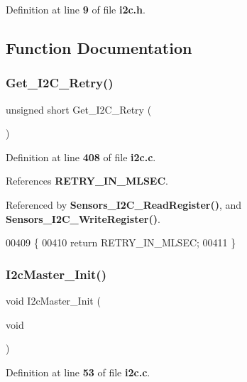 Definition at line \textbf{ 9} of file \textbf{ i2c.\+h}.



\subsection{Function Documentation}
\mbox{\label{i2c_8h_a62f1734db1e997e848ee534e49a7736f}} 
\subsubsection{Get\+\_\+\+I2\+C\+\_\+\+Retry()}
{\footnotesize\ttfamily unsigned short Get\+\_\+\+I2\+C\+\_\+\+Retry (\begin{DoxyParamCaption}{ }\end{DoxyParamCaption})}



Definition at line \textbf{ 408} of file \textbf{ i2c.\+c}.



References \textbf{ R\+E\+T\+R\+Y\+\_\+\+I\+N\+\_\+\+M\+L\+S\+EC}.



Referenced by \textbf{ Sensors\+\_\+\+I2\+C\+\_\+\+Read\+Register()}, and \textbf{ Sensors\+\_\+\+I2\+C\+\_\+\+Write\+Register()}.


\begin{DoxyCode}
00409 \{
00410   \textcolor{keywordflow}{return} RETRY_IN_MLSEC;
00411 \}
\end{DoxyCode}
\mbox{\label{i2c_8h_ae2b2e880b40601327a6ed3e146a84965}} 
\subsubsection{I2c\+Master\+\_\+\+Init()}
{\footnotesize\ttfamily void I2c\+Master\+\_\+\+Init (\begin{DoxyParamCaption}\item[{void}]{ }\end{DoxyParamCaption})}



Definition at line \textbf{ 53} of file \textbf{ i2c.\+c}.



